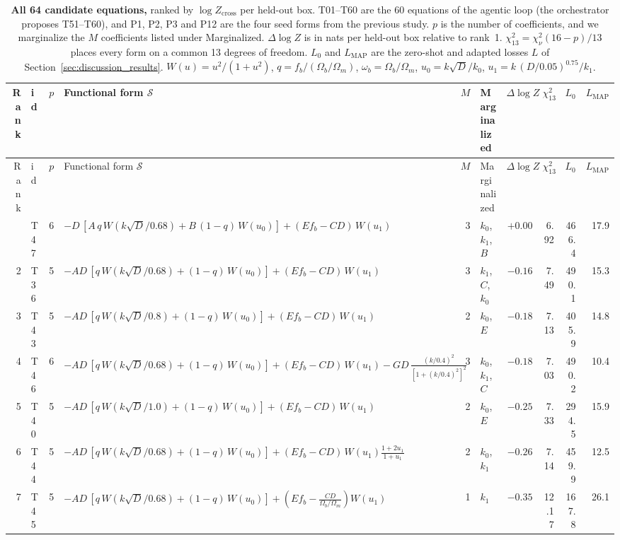 \begingroup\scriptsize\setlength{\tabcolsep}{3pt}
\begin{longtable}{r l r p{} r l r r r r}
\caption{\textbf{All 64 candidate equations,} ranked by $\log Z_\mathrm{cross}$ per held-out box. T01--T60 are the 60 equations of the agentic loop (the orchestrator proposes T51--T60), and P1, P2, P3 and P12 are the four seed forms from the previous study. $p$ is the number of coefficients, and we marginalize the $M$ coefficients listed under Marginalized. $\Delta\log Z$ is in nats per held-out box relative to rank~1. $\chi^2_{13}=\chi^2_\nu(16-p)/13$ places every form on a common 13 degrees of freedom. $L_0$ and $L_\mathrm{MAP}$ are the zero-shot and adapted losses $L$ of Section~\ref{sec:discussion_results}. $W(u)=u^2/(1+u^2)$, $q=f_b/(\Omega_b/\Omega_m)$, $\omega_b=\Omega_b/\Omega_m$, $u_0=k\sqrt{D}/k_0$, $u_1=k\,(D/0.05)^{0.75}/k_1$.\label{tab:pool_full}}\\
\toprule Rank & id & $p$ & Functional form $\mathcal{S}$ & $M$ & Marginalized & $\Delta\log Z$ & $\chi^2_{13}$ & $L_0$ & $L_\mathrm{MAP}$ \\ \midrule\endfirsthead
\toprule Rank & id & $p$ & Functional form $\mathcal{S}$ & $M$ & Marginalized & $\Delta\log Z$ & $\chi^2_{13}$ & $L_0$ & $L_\mathrm{MAP}$ \\ \midrule\endhead
\bottomrule\endlastfoot
1 & T47 & 6 & $-D\,[A\,q\,W(k\sqrt{D}/0.68)+B\,(1-q)\,W(u_0)]+(E f_b-CD)\,W(u_1)$ & 3 & $k_0$, $k_1$, $B$ & $+0.00$ & 6.92 & 466.4 & 17.9 \\
2 & T36 & 5 & $-AD\,[q\,W(k\sqrt{D}/0.68)+(1-q)\,W(u_0)]+(E f_b-CD)\,W(u_1)$ & 3 & $k_1$, $C$, $k_0$ & $-0.16$ & 7.49 & 490.1 & 15.3 \\
3 & T43 & 5 & $-AD\,[q\,W(k\sqrt{D}/0.8)+(1-q)\,W(u_0)]+(E f_b-CD)\,W(u_1)$ & 2 & $k_0$, $E$ & $-0.18$ & 7.13 & 405.9 & 14.8 \\
4 & T46 & 6 & $-AD\,[q\,W(k\sqrt{D}/0.68)+(1-q)\,W(u_0)]+(E f_b-CD)\,W(u_1)-GD\,\frac{(k/0.4)^2}{[1+(k/0.4)^2]^2}$ & 3 & $k_0$, $k_1$, $C$ & $-0.18$ & 7.03 & 490.2 & 10.4 \\
5 & T40 & 5 & $-AD\,[q\,W(k\sqrt{D}/1.0)+(1-q)\,W(u_0)]+(E f_b-CD)\,W(u_1)$ & 2 & $k_0$, $E$ & $-0.25$ & 7.33 & 294.5 & 15.9 \\
6 & T44 & 5 & $-AD\,[q\,W(k\sqrt{D}/0.68)+(1-q)\,W(u_0)]+(E f_b-CD)\,W(u_1)\frac{1+2u_1}{1+u_1}$ & 2 & $k_0$, $k_1$ & $-0.26$ & 7.14 & 459.9 & 12.5 \\
7 & T45 & 5 & $-AD\,[q\,W(k\sqrt{D}/0.68)+(1-q)\,W(u_0)]+\left(E f_b-\frac{CD}{\Omega_b/\Omega_m}\right)W(u_1)$ & 1 & $k_1$ & $-0.35$ & 12.17 & 167.8 & 26.1 \\

\end{longtable}
